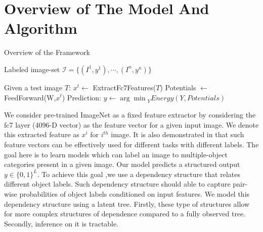 \documentclass{article}
\begin{document}
\section{Overview of The Model And Algorithm}\label{sec:2}


\begin{algorithm}[t]
 \caption{Overview of the Framework}
 \label{algo:overview}
 \begin{algorithmic}[1]
 \REQUIRE Labeled image-set $\mathcal{I} = \{(I^{1},y^{1}),\cdots,(I^{n},y^{n})\}$



 	\REPEAT
	 
	 
	
 		\STATE Given a test image $T$: $x^{t} \leftarrow$  ExtractFc7Features($T$)
	 \STATE  Potentials $\leftarrow$ FeedForward(W,$x^{t}$)
	 \STATE   Prediction: $y \leftarrow {\arg\min}_{ Y } Energy(Y,Potentials)$

 \end{algorithmic}
 \end{algorithm}


We consider pre-trained ImageNet \cite{imagenet} as  a fixed feature extractor by considering the fc7 layer (4096-D vector) as the feature vector for a given input image.  We denote this extracted feature  as $x^{i}$  for $i^{th}$ image.  It is also demonstrated in \cite{transferable} that such feature vectors can be effectively used for different tasks with different labels. The goal here is to learn models which can label an image to multiple-object categories present in a given image. Our model predicts a structured output  $y \in \{0,1\}^{L}$.  To achieve this goal ,we use a dependency structure that relates different object labels. Such dependency structure should able to capture pair-wise probabilities of object labels conditioned on input features. We model this dependency structure using a latent tree. Firstly, these type of structures allow for more complex structures of dependence compared to a fully observed tree. Secondly, inference on it is tractable.
\end{document}
